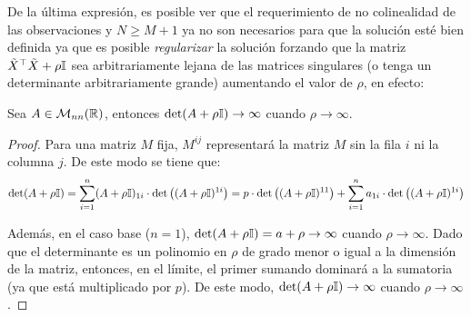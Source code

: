 De la última expresión, es posible ver que el requerimiento de no colinealidad de las observaciones y $N\geq M+1$ ya no son necesarios para que la solución esté bien definida ya que es posible \emph{regularizar} la solución forzando que la matriz $\tilde{X}^\top\tilde{X} +\rho {\mathbb I}$ sea arbitrariamente lejana de las matrices singulares (o tenga un determinante arbitrariamente grande) aumentando el valor de $\rho$, en efecto:

\begin{lemma}
	Sea $A\in\mathcal{M}_{nn}(\mathbb{R})$, entonces $\det(A+\rho{\mathbb I})\to \infty$ cuando $\rho\to\infty$.
\end{lemma}

\begin{proof}
	Para una matriz $M$ fija, $M^{ij}$ representará la matriz $M$ sin la fila $i$ ni la columna $j$. De este modo se tiene que:
	\begin{equation}
		\det(A+\rho{\mathbb I}) = \sum_{i=1}^n (A+\rho{\mathbb I})_{1i}\cdot \det\left((A+\rho{\mathbb I})^{1i}\right) = p\cdot\det\left((A+\rho{\mathbb I})^{11}\right) + \sum_{i=1}^n a_{1i}\cdot \det\left((A+\rho{\mathbb I})^{1i}\right)
	\end{equation}
	
	Además, en el caso base ($n=1$), $\det(A+\rho{\mathbb I})=a+\rho\to\infty$ cuando $\rho\to\infty$. Dado que el determinante es un polinomio en $\rho$ de grado menor o igual a la dimensión de la matriz, entonces, en el límite, el primer sumando dominará a la sumatoria (ya que está multiplicado por $p$). De este modo, $\det(A+\rho{\mathbb I})\to \infty$ cuando $\rho\to\infty$.
\end{proof}


